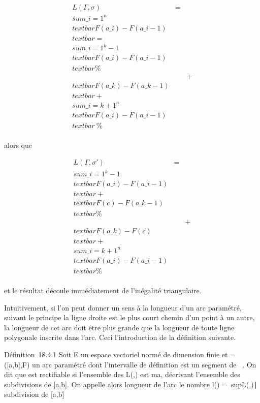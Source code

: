 \documentclass[]{article}
\begin{document}
\begin{align*} L(\Gamma,\sigma)& =&
\\sum
\_i=1^n\\textbar{}F(a\_ i) -
F(a\_i-1)\\textbar{} =
\\sum
\_i=1^k-1\\textbar{}F(a\_ i) -
F(a\_i-1)\\textbar{}\%&
\\ & &
+\\textbar{}F(a\_k) -
F(a\_k-1)\\textbar{} +
\\sum
\_i=k+1^n\\textbar{}F(a\_ i) -
F(a\_i-1)\\textbar{}\ \%&
\\ \end{align*}

alors que

\begin{align*} L(\Gamma,\sigma')& =&
\\sum
\_i=1^k-1\\textbar{}F(a\_ i) -
F(a\_i-1)\\textbar{} +\\textbar{}
F(c) - F(a\_k-1)\\textbar{}\%&
\\ & &
+\\textbar{}F(a\_k) -
F(c)\\textbar{} + \\sum
\_i=k+1^n\\textbar{}F(a\_ i) -
F(a\_i-1)\\textbar{}\%&
\\ \end{align*}

et le résultat découle immédiatement de l'inégalité triangulaire.

Intuitivement, si l'on peut donner un sens à la longueur d'un arc
paramétré, suivant le principe la ligne droite est le plus court chemin
d'un point à un autre, la longueur de cet arc doit être plus grande que
la longueur de toute ligne polygonale inscrite dans l'arc. Ceci \jmathustifie
l'introduction de la définition suivante.

Définition~18.4.1 Soit E un espace vectoriel normé de dimension finie et
\Gamma = ({[}a,b{]},F) un arc paramétré dont l'intervalle de définition est
un segment de ~. On dit que \Gamma est rectifiable si l'ensemble des L(\Gamma,\sigma)
est ma, \sigma décrivant l'ensemble des subdivisions de {[}a,b{]}. On
appelle alors longueur de l'arc \Gamma le nombre l(\Gamma)
=\
sup\L(\Gamma,\sigma)∣\sigma\text
subdivision de {[}a,b{]}\.
\end{document}
